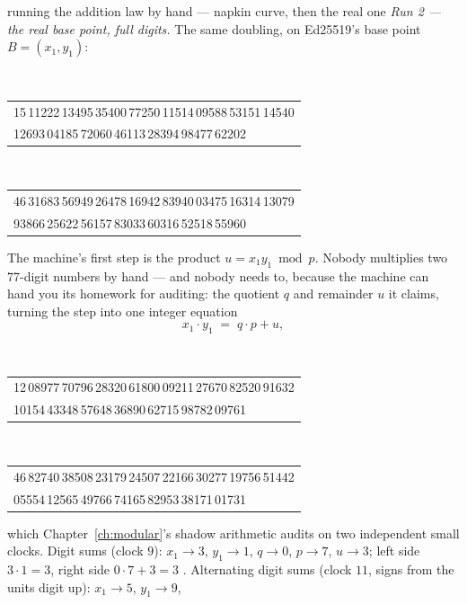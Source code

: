 \begin{worked}{running the addition law by hand --- napkin curve, then the real one}
\emph{Run 2 --- the real base point, full digits.} The same doubling, on
Ed25519's base point $B = (x_1, y_1)$:
\par{}\\[-2pt]
{\footnotesize\ttfamily\begin{tabular}{@{}l@{}}15\,11222\,13495\,35400\,77250\,11514\,09588\,53151\,14540\\
12693\,04185\,72060\,46113\,28394\,98477\,62202\end{tabular}}\par\smallskip
\par{}\\[-2pt]
{\footnotesize\ttfamily\begin{tabular}{@{}l@{}}46\,31683\,56949\,26478\,16942\,83940\,03475\,16314\,13079\\
93866\,25622\,56157\,83033\,60316\,52518\,55960\end{tabular}}\par\smallskip
The machine's first step is the product $u = x_1 y_1 \bmod p$. Nobody
multiplies two 77-digit numbers by hand --- and nobody needs to, because
the machine can hand you its homework for auditing: the quotient $q$ and
remainder $u$ it claims, turning the step into one integer equation
\[
x_1 \cdot y_1 \;=\; q \cdot p + u ,
\]
\par{}\\[-2pt]
{\footnotesize\ttfamily\begin{tabular}{@{}l@{}}12\,08977\,70796\,28320\,61800\,09211\,27670\,82520\,91632\\
10154\,43348\,57648\,36890\,62715\,98782\,09761\end{tabular}}\par\smallskip
\par{}\\[-2pt]
{\footnotesize\ttfamily\begin{tabular}{@{}l@{}}46\,82740\,38508\,23179\,24507\,22166\,30277\,19756\,51442\\
05554\,12565\,49766\,74165\,82953\,38171\,01731\end{tabular}}\par\smallskip
which Chapter~\ref{ch:modular}'s shadow arithmetic audits on two
independent small clocks. Digit sums (clock $9$): $x_1 \to 3$,
$y_1 \to 1$, $q \to 0$, $p \to 7$, $u \to 3$; left side $3\cdot 1 = 3$,
right side $0 \cdot 7 + 3 = 3$ \checkmark. Alternating digit sums (clock
$11$, signs from the units digit up): $x_1 \to 5$, $y_1 \to 9$,

\end{worked}
